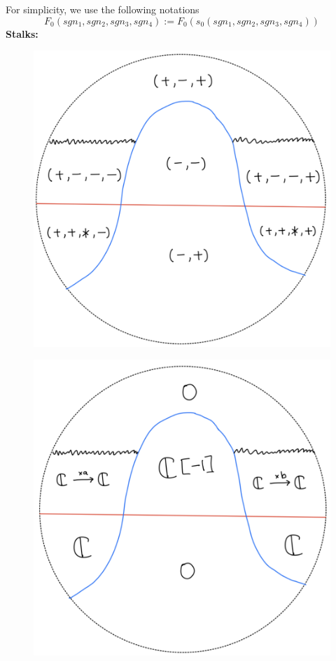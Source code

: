 For simplicity, we use the following notations
\[
F_0(sgn_1,sgn_2,sgn_3,sgn_4):=F_0(s_0(sgn_1,sgn_2,sgn_3,sgn_4))
\]
\textbf{Stalks:}
\begin{figure}[H]
    \centering
    \includegraphics[scale = 0.95]{diagrams/lemma2/27.png} 
    \caption{}
    \label{fig:your-label}
\end{figure}
\begin{figure}[H]
    \centering
    \includegraphics[scale = 0.95]{diagrams/lemma2/28.png} 
    \caption{}
    \label{fig:your-label}
\end{figure}
